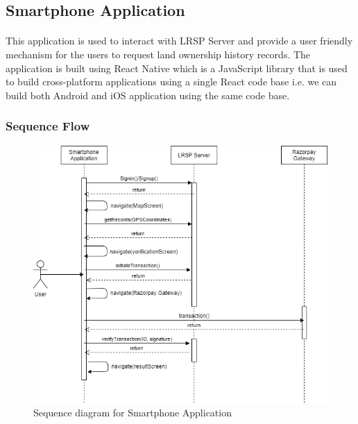 \documentclass{article}
\begin{document}
    \subsection{Smartphone Application}
        \paragraph{}
        This application is used to interact with LRSP Server and provide a user friendly mechanism for the users to request land ownership history records.
        The application is built using React Native which is a JavaScript library that is used to build cross-platform applications using a single React code base i.e. we can build both Android and iOS application using the same code base. 
        
        \subsubsection{Sequence Flow}
        \begin{figure}[htbp]
            \includegraphics[scale=0.5]{app_sequence}
            \centering
            \caption{Sequence diagram for Smartphone Application}
        \end{figure}
\end{document}
